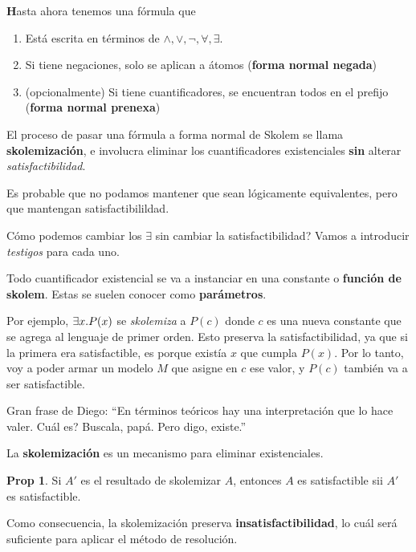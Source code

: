 \documentclass{report}
\theoremstyle{definition} %
\newtheorem*{proposition*}{Prop}
\newenvironment{nota}[1]
    {\begin{leftbar}\textbf{#1}}
    {\end{leftbar}}
\begin{document}
\begin{nota}
    Hasta ahora tenemos una fórmula que
    \begin{enumerate}
        \item Está escrita en términos de $\wedge, \vee, \neg, \forall,
        \exists$.
        \item Si tiene negaciones, solo se aplican a átomos (\textbf{forma
        normal negada})
        \item (opcionalmente) Si tiene cuantificadores, se encuentran todos en
        el prefijo (\textbf{forma normal prenexa})
    \end{enumerate}

    El proceso de pasar una fórmula a forma normal de Skolem se llama
    \textbf{skolemización}, e involucra eliminar los cuantificadores
    existenciales \textbf{sin} alterar \textit{satisfactibilidad}.

    Es probable que no podamos mantener que sean lógicamente equivalentes, pero
    que mantengan satisfactibilildad.

    Cómo podemos cambiar los $\exists$ sin cambiar la satisfactibilidad? Vamos a
    introducir \textit{testigos} para cada uno.

    Todo cuantificador existencial se va a instanciar en una constante o
    \textbf{función de skolem}. Estas se suelen conocer como
    \textbf{parámetros}.

    Por ejemplo, $\exists x . P(x)$ se \textit{skolemiza} a $P(c)$ donde $c$ es
    una nueva constante que se agrega al lenguaje de primer orden. Esto preserva
    la satisfactibilidad, ya que si la primera era satisfactible, es porque
    existía $x$ que cumpla $P(x)$. Por lo tanto, voy a poder armar un modelo $M$
    que asigne en $c$ ese valor, y $P(c)$ también va a ser satisfactible.
    
    Gran frase de Diego: ``En términos teóricos hay una interpretación que lo
    hace valer. Cuál es? Buscala, papá. Pero digo, existe.''
\end{nota}

La \textbf{skolemización} es un mecanismo para eliminar existenciales.

\begin{proposition*}
    Si $A'$ es el resultado de skolemizar $A$, entonces $A$ es satisfactible sii
    $A'$ es satisfactible.

    Como consecuencia, la skolemización preserva \textbf{insatisfactibilidad},
    lo cuál será suficiente para aplicar el método de resolución.
\end{proposition*}
\end{document}
